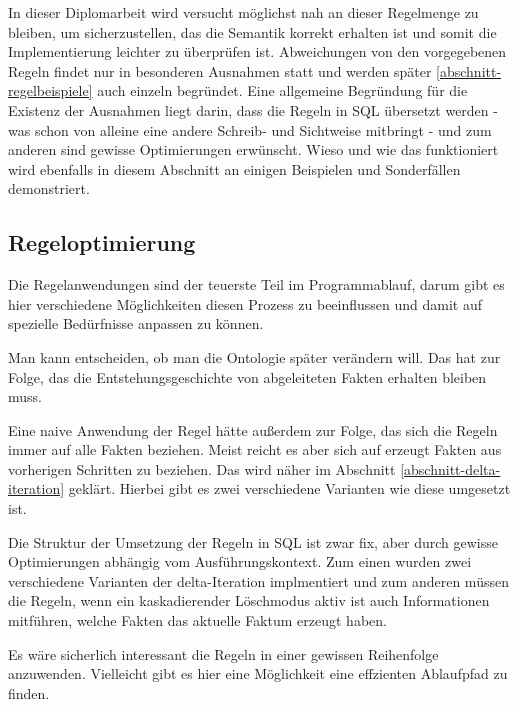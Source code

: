 In dieser Diplomarbeit wird versucht möglichst nah an dieser Regelmenge zu bleiben, um sicherzustellen, das die Semantik korrekt erhalten ist und somit die Implementierung leichter zu überprüfen ist.
Abweichungen von den vorgegebenen Regeln findet nur in besonderen Ausnahmen statt und werden später \ref{abschnitt-regelbeispiele} auch einzeln begründet. Eine allgemeine Begründung für die Existenz der Ausnahmen liegt darin, dass die Regeln in SQL übersetzt werden - was schon von alleine eine andere Schreib- und Sichtweise  mitbringt - und zum anderen sind gewisse Optimierungen erwünscht.
Wieso und wie das funktioniert wird ebenfalls in diesem Abschnitt an einigen Beispielen und Sonderfällen demonstriert.






\subsection{Regeloptimierung}

Die Regelanwendungen sind der teuerste Teil im Programmablauf, darum gibt es hier verschiedene Möglichkeiten diesen Prozess zu beeinflussen und damit auf spezielle Bedürfnisse anpassen zu können.

Man kann entscheiden, ob man die Ontologie später verändern will. Das hat zur Folge, das die Entstehungsgeschichte von abgeleiteten Fakten erhalten bleiben muss.

Eine naive Anwendung der Regel hätte außerdem zur Folge, das sich die Regeln immer auf alle Fakten beziehen. Meist reicht es aber sich auf erzeugt Fakten aus vorherigen Schritten zu beziehen. Das wird näher im Abschnitt \ref{abschnitt-delta-iteration} geklärt. Hierbei gibt es zwei verschiedene Varianten wie diese umgesetzt ist.

Die Struktur der Umsetzung der Regeln in SQL ist zwar fix, aber durch gewisse Optimierungen abhängig vom Ausführungskontext. Zum einen wurden zwei verschiedene Varianten der delta-Iteration implmentiert und zum anderen müssen die Regeln, wenn ein kaskadierender Löschmodus aktiv ist auch Informationen mitführen, welche Fakten das aktuelle Faktum erzeugt haben.

Es wäre sicherlich interessant die Regeln in einer gewissen Reihenfolge anzuwenden. Vielleicht gibt es hier eine Möglichkeit eine effzienten Ablaufpfad zu finden.